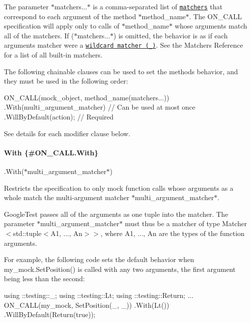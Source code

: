 The parameter $\ast${\ttfamily matchers...}$\ast$ is a comma-\/separated list of \href{../gmock_for_dummies.md#matchers-what-arguments-do-we-expect}{\tt matchers} that correspond to each argument of the method $\ast${\ttfamily method\+\_\+name}$\ast$. The {\ttfamily O\+N\+\_\+\+C\+A\+LL} specification will apply only to calls of $\ast${\ttfamily method\+\_\+name}$\ast$ whose arguments match all of the matchers. If {\ttfamily (}$\ast${\ttfamily matchers...}$\ast${\ttfamily )} is omitted, the behavior is as if each argument\textquotesingle{}s matcher were a \href{matchers.md#wildcard}{\tt wildcard matcher ({\ttfamily \+\_\+})}. See the Matchers Reference for a list of all built-\/in matchers.

The following chainable clauses can be used to set the method\textquotesingle{}s behavior, and they must be used in the following order\+:


\begin{DoxyCode}
ON\_CALL(mock\_object, method\_name(matchers...))
    .With(multi\_argument\_matcher)  \textcolor{comment}{// Can be used at most once}
    .WillByDefault(action);        \textcolor{comment}{// Required}
\end{DoxyCode}


See details for each modifier clause below.

\paragraph*{With \{\#\+O\+N\+\_\+\+C\+A\+L\+L.\+With\}}

{\ttfamily .With(}$\ast${\ttfamily multi\+\_\+argument\+\_\+matcher}$\ast${\ttfamily )}

Restricts the specification to only mock function calls whose arguments as a whole match the multi-\/argument matcher $\ast${\ttfamily multi\+\_\+argument\+\_\+matcher}$\ast$.

Google\+Test passes all of the arguments as one tuple into the matcher. The parameter $\ast${\ttfamily multi\+\_\+argument\+\_\+matcher}$\ast$ must thus be a matcher of type {\ttfamily Matcher$<$std\+::tuple$<$A1, ..., An$>$$>$}, where {\ttfamily A1, ..., An} are the types of the function arguments.

For example, the following code sets the default behavior when {\ttfamily my\+\_\+mock.\+Set\+Position()} is called with any two arguments, the first argument being less than the second\+:


\begin{DoxyCode}
using ::testing::\_;
using ::testing::Lt;
using ::testing::Return;
...
ON\_CALL(my\_mock, SetPosition(\_, \_))
    .With(Lt())
    .WillByDefault(Return(\textcolor{keyword}{true}));
\end{DoxyCode}


